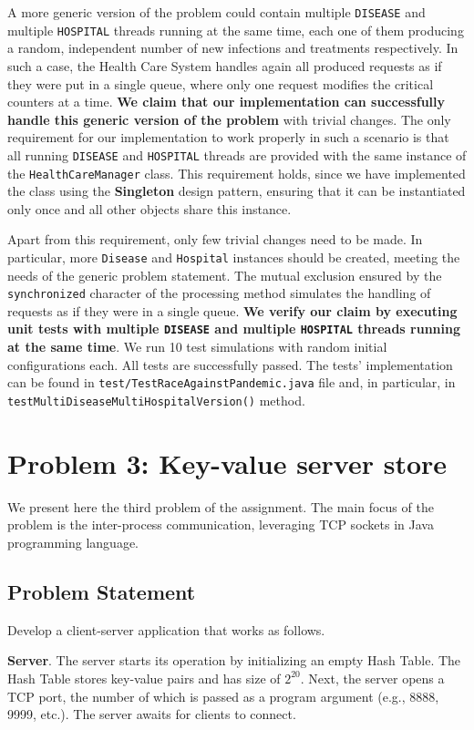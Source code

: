 \documentclass[acmlarge]{acmart}
\newcommand{\disease}{{\small \texttt{DISEASE}} }
\newcommand{\hospital}{{\small \texttt{HOSPITAL}} }
\begin{document}
A more generic version of the problem could contain multiple \disease and multiple \hospital threads running at the same time, each one of them producing a random, independent number of new infections and treatments respectively. In such a case, the Health Care System handles again all produced requests as if they were put in a single queue, where only one request modifies the critical counters at a time. \textbf{We claim that our implementation can successfully handle this generic version of the problem} with trivial changes. The only requirement for our implementation to work properly in such a scenario is that all running \disease and \hospital threads are provided with the same instance of the \texttt{HealthCareManager} class. This requirement holds, since we have implemented the class using the \textbf{Singleton} design pattern, ensuring that it can be instantiated only once and all other objects share this instance.

Apart from this requirement, only few trivial changes need to be made. In particular, more \texttt{Disease} and \texttt{Hospital} instances should be created, meeting the needs of the generic problem statement. The mutual exclusion ensured by the \texttt{synchronized} character of the processing method simulates the handling of requests as if they were in a single queue. \textbf{We verify our claim by executing unit tests with multiple \disease and multiple \hospital threads running at the same time}. We run 10 test simulations with random initial configurations each. All tests are successfully passed. The tests' implementation can be found in \texttt{test/TestRaceAgainstPandemic.java} file and, in particular, in \texttt{testMultiDiseaseMultiHospitalVersion()} method. 


\section{Problem 3: Key-value server store}
\label{section:problem3}
We present here the third problem of the assignment. The main focus of the problem is the inter-process communication, leveraging TCP sockets in Java programming language.

\subsection{Problem Statement}
Develop a client-server application that works as follows.

\textbf{Server}. The server starts its operation by initializing an empty Hash Table. The Hash Table stores key-value pairs and has size of $2^{20}$. Next, the server opens a TCP port, the number of which is passed as a program argument (e.g., 8888, 9999, etc.). The server awaits for clients to connect.
\end{document}
